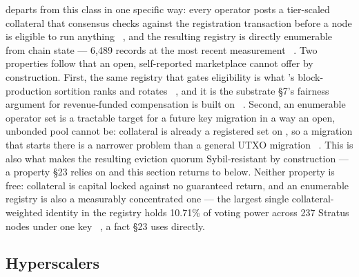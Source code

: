 \Flux departs from this class in one specific way: every \FluxNode operator posts a tier-scaled
collateral that consensus checks against the registration transaction before a node is eligible to run
anything \shipped\ , and the resulting registry is directly
enumerable from chain state — 6{,}489 records at the most recent measurement \shipped\
. Two properties follow that an open,
self-reported marketplace cannot offer by construction. First, the same registry that gates eligibility
is what \PoN's block-production sortition ranks and rotates \shipped\
, and it is the substrate §7's fairness argument for
revenue-funded compensation is built on \planned\ \srcintent{§7}. Second, an enumerable operator set is
a tractable target for a future key migration in a way an open, unbonded pool cannot be: collateral is
already a registered set on \Flux, so a migration that starts there is a narrower problem than a
general UTXO migration \vision\ \srcintent{feasibility assessment}. This is also what makes the resulting
eviction quorum Sybil-resistant by construction \citep{douceur2002sybil} — a property §23 relies on and
this section returns to below. Neither property is free: collateral is capital locked against no
guaranteed return, and an enumerable registry is also a measurably concentrated one — the largest single
collateral-weighted identity in the registry holds 10.71\% of voting power across 237 Stratus nodes
under one key \shipped\ , a fact §23 uses
directly.

\subsection{Hyperscalers}

